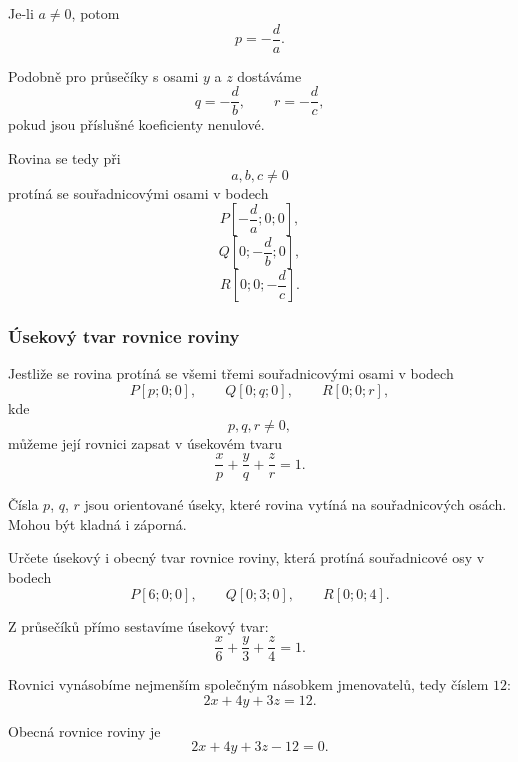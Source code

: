 Je-li $a\neq0$, potom
\[
    p=-\frac{d}{a}.
\]

Podobně pro průsečíky s osami $y$ a $z$ dostáváme
\[
    q=-\frac{d}{b},
    \qquad
    r=-\frac{d}{c},
\]
pokud jsou příslušné koeficienty nenulové.

Rovina se tedy při
\[
    a,b,c\neq0
\]
protíná se souřadnicovými osami v bodech
\[
    P\left[-\frac{d}{a};0;0\right],
\]
\[
    Q\left[0;-\frac{d}{b};0\right],
\]
\[
    R\left[0;0;-\frac{d}{c}\right].
\]


\subsubsection{Úsekový tvar rovnice roviny}
\label{subsubsec:Intercept_form_plane}

Jestliže se rovina protíná se všemi třemi souřadnicovými osami v bodech
\[
    P[p;0;0],
    \qquad
    Q[0;q;0],
    \qquad
    R[0;0;r],
\]
kde
\[
    p,q,r\neq0,
\]
můžeme její rovnici zapsat v úsekovém tvaru
\begin{equation}
    \frac{x}{p}
    +
    \frac{y}{q}
    +
    \frac{z}{r}
    =
    1.
    \label{eq:Intercept_form_plane}
\end{equation}

Čísla $p$, $q$, $r$ jsou orientované úseky, které rovina vytíná
na souřadnicových osách. Mohou být kladná i záporná.

\begin{example}
    \label{exa:Intercept_form_plane}

    Určete úsekový i obecný tvar rovnice roviny, která protíná
    souřadnicové osy v bodech
    \[
        P[6;0;0],
        \qquad
        Q[0;3;0],
        \qquad
        R[0;0;4].
    \]

    Z průsečíků přímo sestavíme úsekový tvar:
    \[
        \frac{x}{6}
        +
        \frac{y}{3}
        +
        \frac{z}{4}
        =
        1.
    \]

    Rovnici vynásobíme nejmenším společným násobkem jmenovatelů,
    tedy číslem $12$:
    \[
        2x+4y+3z=12.
    \]

    Obecná rovnice roviny je
    \[
        2x+4y+3z-12=0.
    \]
\end{example}

